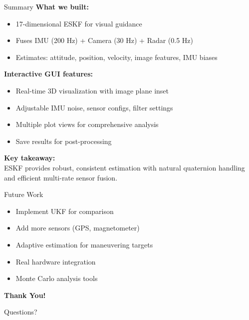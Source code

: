 \documentclass{beamer}
\begin{document}
\begin{frame}{Summary}
\textbf{What we built:}
\begin{itemize}
    \item 17-dimensional ESKF for visual guidance
    \item Fuses IMU (200 Hz) + Camera (30 Hz) + Radar (0.5 Hz)
    \item Estimates: attitude, position, velocity, image features, IMU biases
\end{itemize}

\vspace{0.5cm}
\textbf{Interactive GUI features:}
\begin{itemize}
    \item Real-time 3D visualization with image plane inset
    \item Adjustable IMU noise, sensor configs, filter settings
    \item Multiple plot views for comprehensive analysis
    \item Save results for post-processing
\end{itemize}

\vspace{0.5cm}
\textbf{Key takeaway:}\\
ESKF provides robust, consistent estimation with natural quaternion handling and efficient multi-rate sensor fusion.
\end{frame}

\begin{frame}{Future Work}
\begin{itemize}
    \item Implement UKF for comparison
    \item Add more sensors (GPS, magnetometer)
    \item Adaptive estimation for maneuvering targets
    \item Real hardware integration
    \item Monte Carlo analysis tools
\end{itemize}

\vspace{1cm}
\begin{center}
\Large\textbf{Thank You!}

\vspace{0.5cm}
\normalsize Questions?
\end{center}
\end{frame}
\end{document}
